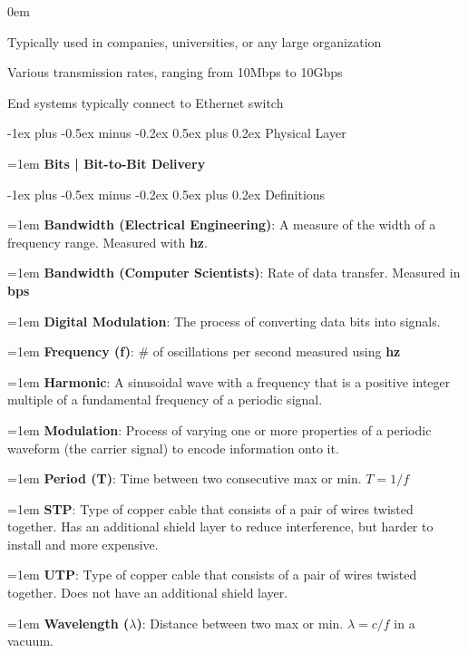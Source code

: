 \documentclass[letterpaper,8pt]{extarticle}
\makeatletter
\newcommand{\definition}[2]{
  \hangindent=1em
  \textbf{#1}: #2%
}
\newcommand{\subtitle}[2]{
  \hangindent=1em
  \textbf{\color{h4}#1 | #2}\\
  \hrulefill
}
\renewcommand{\section}{\@startsection{section}{1}{0mm}%
  {-1ex plus -0.5ex minus -0.2ex}%
  {0.5ex plus 0.2ex}%
{\color{h1} \normalfont\small\bfseries}}
\renewcommand{\subsection}{\@startsection{subsection}{2}{0mm}%
  {-1ex plus -0.5ex minus -0.2ex}%
  {0.5ex plus 0.2ex}%
{\color{h2}\normalfont\fontsize{6}{6}\selectfont\bfseries}}
\let\olditemize\itemize \let\endolditemize\enditemize
\renewenvironment{itemize}{\olditemize \itemsep0em}{\endolditemize}
\makeatother
\begin{document}
\begin{multicols*}{5}
  \begin{itemize}
    \item Typically used in companies, universities, or any large organization
    \item Various transmission rates, ranging from 10Mbps to 10Gbps
    \item End systems typically connect to Ethernet switch
  \end{itemize}

  \section{Physical Layer}

  \subtitle{Bits}{Bit-to-Bit Delivery}

  \subsection{Definitions}

  \definition{Bandwidth (Electrical Engineering)}{A measure of the
  width of a frequency range. Measured with \textbf{hz}.}

  \definition{Bandwidth (Computer Scientists)}{Rate of data transfer.
  Measured in \textbf{bps}}

  \definition{Digital Modulation}{The process of converting data bits
  into signals.}

  \definition{Frequency (f)}{\# of oscillations per second measured using \textbf{hz}}

  \definition{Harmonic}{A sinusoidal wave with a frequency that is a positive integer multiple of a fundamental frequency of a periodic signal.}

  \definition{Modulation}{Process of varying one or more properties of a periodic waveform (the carrier signal) to encode information onto it.}

  \definition{Period (T)}{Time between two consecutive max or min. $T = 1/f$}

  \definition{STP}{Type of copper cable that consists of a pair of wires twisted together. Has an additional shield layer to reduce interference, but harder to install and more expensive.}

  \definition{UTP}{Type of copper cable that consists of a pair of wires twisted together. Does not have an additional shield layer.}

  \definition{Wavelength ($\lambda$)}{Distance between two max or min. $\lambda = c/f$ in a vacuum.}


\end{multicols*}
\end{document}
